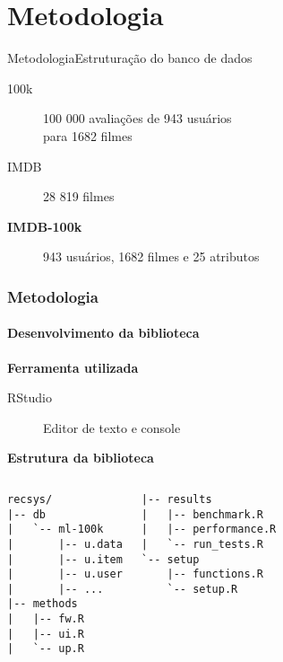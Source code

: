 \section[Metodologia]{Metodologia}
\begin{frame}{Metodologia}{Estruturação do banco de dados}

\begin{description}
	\item[100k] 100 000 avaliações de 943 usuários \\ para 1682 filmes
	\item[IMDB] 28 819 filmes
	\item[\textbf{IMDB-100k}] 943 usuários, 1682 filmes e 25 atributos
\end{description}
\end{frame}

\begin{frame}[fragile]
\frametitle{Metodologia}
\framesubtitle{Desenvolvimento da biblioteca}


\textbf{Ferramenta utilizada}
	\begin{description}
		\item[RStudio] Editor de texto e console
	\end{description}
\textbf{Estrutura da biblioteca}
\begin{columns}
\begin{verbatim}
recsys/
|-- db
|   `-- ml-100k
|       |-- u.data
|       |-- u.item
|       |-- u.user
|       |-- ...
|-- methods
|   |-- fw.R
|   |-- ui.R
|   `-- up.R
\end{verbatim}
\begin{verbatim}
|-- results
|   |-- benchmark.R
|   |-- performance.R
|   `-- run_tests.R
`-- setup
    |-- functions.R
    `-- setup.R
\end{verbatim}
\end{columns}
\end{frame}


